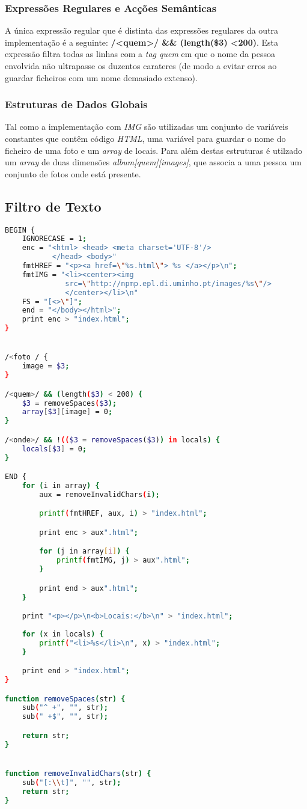 \documentclass{article}
\begin{document}
\subsubsection{Expressões Regulares e Acções Semânticas}
A única expressão regular que é distinta das expressões regulares da outra implementação é a seguinte: \textbf{/\textless quem\textgreater/ && (length(\$3) \textless 200)}. Esta expressão filtra todas as linhas com a \emph{tag quem} em que o nome da pessoa envolvida não ultrapasse os duzentos carateres (de modo a evitar erros ao guardar ficheiros com um nome demasiado extenso).  


\subsubsection{Estruturas de Dados Globais}
Tal como a implementação com \emph{IMG} são utilizadas um conjunto de variáveis constantes que contêm código \emph{HTML}, uma variável para guardar o nome do ficheiro de uma foto e um \emph{array} de locais. Para além destas estruturas é utilzado um \emph{array} de duas dimensões \emph{album[quem][images]}, que associa a uma pessoa um conjunto de fotos onde está presente.

\subsection{Filtro de Texto}
\begin{lstlisting}[language=bash]
BEGIN {
	IGNORECASE = 1;
	enc = "<html> <head> <meta charset='UTF-8'/>
	       </head> <body>"
	fmtHREF = "<p><a href=\"%s.html\"> %s </a></p>\n";
	fmtIMG = "<li><center><img 
	          src=\"http://npmp.epl.di.uminho.pt/images/%s\"/> 
	          </center></li>\n"
	FS = "[<>\"]";
	end = "</body></html>";
	print enc > "index.html";
}


/<foto / {
	image = $3;
}

/<quem>/ && (length($3) < 200) {
	$3 = removeSpaces($3);
	array[$3][image] = 0;
}

/<onde>/ && !(($3 = removeSpaces($3)) in locals) {
	locals[$3] = 0;
}

END {
	for (i in array) {
		aux = removeInvalidChars(i);

		printf(fmtHREF, aux, i) > "index.html";

		print enc > aux".html";

		for (j in array[i]) {
			printf(fmtIMG, j) > aux".html";
		}

		print end > aux".html";
	}

	print "<p></p>\n<b>Locais:</b>\n" > "index.html";
	
	for (x in locals) {
		printf("<li>%s</li>\n", x) > "index.html";
	}

	print end > "index.html";
}

function removeSpaces(str) {
	sub("^ +", "", str);
	sub(" +$", "", str);

	return str;
}


function removeInvalidChars(str) {
	sub("[:\\t]", "", str);
	return str;
}

\end{lstlisting}
\end{document}
